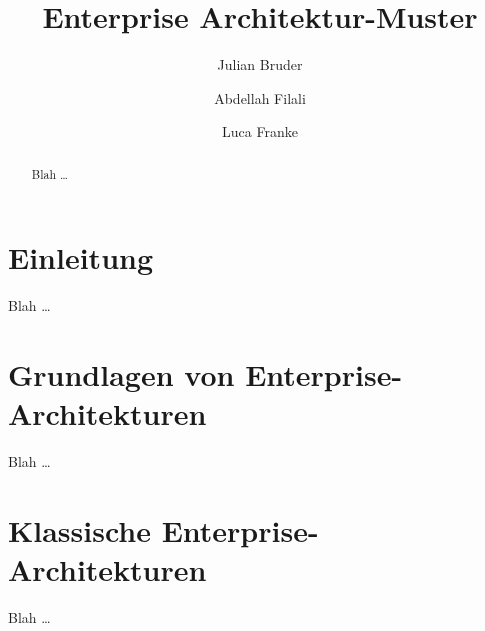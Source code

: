 \documentclass[acmtog]{acmart}
\begin{document}
    \title{Enterprise Architektur-Muster}

    \author{Julian Bruder}
    \author{Abdellah Filali}
    \authornotemark[1]
    \author{Luca Franke}
    \authornotemark[1]
    \renewcommand{\shortauthors}{Bruder, Filali, Franke}

    \begin{abstract}
        Blah \ldots
    \end{abstract}

    \maketitle


    \section{Einleitung}
    Blah \ldots


    \section{Grundlagen von Enterprise-Architekturen}
    Blah \ldots


    \section{Klassische Enterprise-Architekturen}
    Blah \ldots
\end{document}
